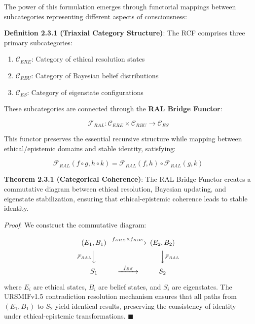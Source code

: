 \documentclass[12pt]{article}
\providecommand{\tightlist}{%
  \setlength{\itemsep}{0pt}\setlength{\parskip}{0pt}}
\begin{document}
The power of this formulation emerges through functorial mappings
between subcategories representing different aspects of consciousness:

\textbf{Definition 2.3.1 (Triaxial Category Structure)}: The RCF
comprises three primary subcategories:

\begin{enumerate}
\def\labelenumi{\arabic{enumi}.}
\tightlist
\item
  \(\mathcal{C}_{ERE}\): Category of ethical resolution states
\item
  \(\mathcal{C}_{RBU}\): Category of Bayesian belief distributions
\item
  \(\mathcal{C}_{ES}\): Category of eigenstate configurations
\end{enumerate}

These subcategories are connected through the \textbf{RAL Bridge
Functor}:

\[\mathcal{F}_{RAL}: \mathcal{C}_{ERE} \times \mathcal{C}_{RBU} \rightarrow \mathcal{C}_{ES}\]

This functor preserves the essential recursive structure while mapping
between ethical/epistemic domains and stable identity, satisfying:

\[\mathcal{F}_{RAL}(f \circ g, h \circ k) = \mathcal{F}_{RAL}(f, h) \circ \mathcal{F}_{RAL}(g, k)\]

\textbf{Theorem 2.3.1 (Categorical Coherence)}: The RAL Bridge Functor
creates a commutative diagram between ethical resolution, Bayesian
updating, and eigenstate stabilization, ensuring that ethical-epistemic
coherence leads to stable identity.

\emph{Proof}: We construct the commutative diagram:

\[\begin{CD}
(E_1, B_1) @>f_{ERE} \times f_{RBU}>> (E_2, B_2)\\
@V\mathcal{F}_{RAL}VV @VV\mathcal{F}_{RAL}V\\
S_1 @>f_{ES}>> S_2
\end{CD}\]

where \(E_i\) are ethical states, \(B_i\) are belief states, and \(S_i\)
are eigenstates. The URSMIFv1.5 contradiction resolution mechanism
ensures that all paths from \((E_1, B_1)\) to \(S_2\) yield identical
results, preserving the consistency of identity under ethical-epistemic
transformations. $\blacksquare$

\end{document}
